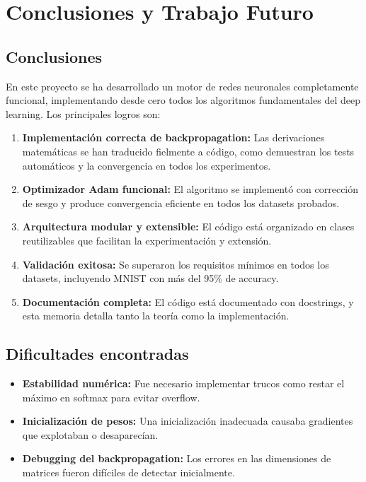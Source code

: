 \documentclass[a4paper,11pt]{article}
\begin{document}
\newpage
\section{Conclusiones y Trabajo Futuro}

\subsection{Conclusiones}

En este proyecto se ha desarrollado un motor de redes neuronales completamente funcional, implementando desde cero todos los algoritmos fundamentales del deep learning. Los principales logros son:

\begin{enumerate}
    \item \textbf{Implementación correcta de backpropagation:} Las derivaciones matemáticas se han traducido fielmente a código, como demuestran los tests automáticos y la convergencia en todos los experimentos.
    
    \item \textbf{Optimizador Adam funcional:} El algoritmo se implementó con corrección de sesgo y produce convergencia eficiente en todos los datasets probados.
    
    \item \textbf{Arquitectura modular y extensible:} El código está organizado en clases reutilizables que facilitan la experimentación y extensión.
    
    \item \textbf{Validación exitosa:} Se superaron los requisitos mínimos en todos los datasets, incluyendo MNIST con más del 95\% de accuracy.
    
    \item \textbf{Documentación completa:} El código está documentado con docstrings, y esta memoria detalla tanto la teoría como la implementación.
\end{enumerate}

\subsection{Dificultades encontradas}

\begin{itemize}
    \item \textbf{Estabilidad numérica:} Fue necesario implementar trucos como restar el máximo en softmax para evitar overflow.
    
    \item \textbf{Inicialización de pesos:} Una inicialización inadecuada causaba gradientes que explotaban o desaparecían.
    
    \item \textbf{Debugging del backpropagation:} Los errores en las dimensiones de matrices fueron difíciles de detectar inicialmente.
\end{itemize}
\end{document}
